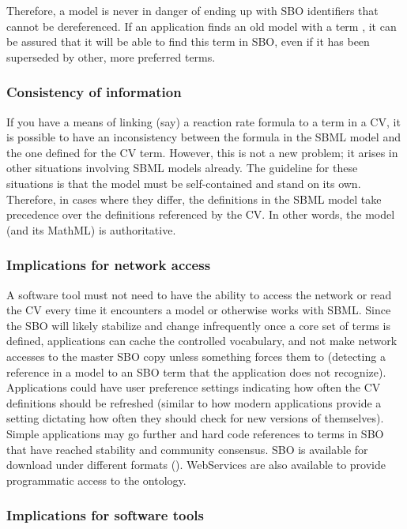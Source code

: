 Therefore, a model is never in danger of ending up with SBO
identifiers that cannot be dereferenced.  If an application finds
an old model with a term , it can be assured
that it will be able to find this term in SBO, even if it has been
superseded by other, more preferred terms.

\subsubsection{Consistency of information}

If you have a means of linking (say) a reaction rate formula to a
term in a CV, it is possible to have an inconsistency between the
formula in the SBML model and the one defined for the CV term.
However, this is not a new problem; it arises in other situations
involving SBML models already.  The guideline for these situations
is that the model must be self-contained and stand on its own.
Therefore, in cases where they differ, the definitions in the SBML
model take precedence over the definitions referenced by the CV.
In other words, the model (and its MathML) is authoritative.

\subsubsection{Implications for network access}
\label{sec:sbo-implications-for-network-access}

A software tool must not need to have the ability to access the network or
read the CV every time it encounters a model or otherwise works
with SBML.  Since the SBO will likely stabilize and change
infrequently once a core set of terms is defined, applications can
cache the controlled vocabulary, and not make network accesses to
the master SBO copy unless something forces them to (\eg detecting
a reference in a model to an SBO term that the application does
not recognize).  Applications could have user
preference settings indicating how often the CV definitions should
be refreshed (similar to how modern applications provide a setting
dictating how often they should check for new versions of
themselves).  Simple applications may go further and hard code
references to terms in SBO that have reached stability and
community consensus. SBO is available for download under different formats (\sboref). WebServices are also available to provide programmatic access to the ontology.

\subsubsection{Implications for software tools}

